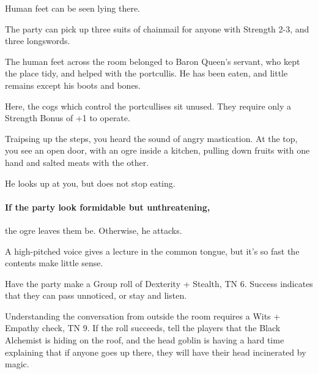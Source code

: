 \begin{multicols}{2}
\begin{boxtext}
	Human feet can be seen lying there.

\end{boxtext}

The party can pick up three suits of chainmail for anyone with Strength 2-3, and three longswords.

The human feet across the room belonged to Baron Queen's servant, who kept the place tidy, and helped with the portcullis.
He has been eaten, and little remains except his boots and bones.


Here, the cogs which control the portcullises sit unused.
They require only a Strength Bonus of +1 to operate.


\begin{boxtext}

	Traipsing up the steps, you heard the sound of angry mastication.
	At the top, you see an open door, with an ogre inside a kitchen, pulling down fruits with one hand and salted meats with the other.

	He looks up at you, but does not stop eating.

\end{boxtext}

\paragraph{If the party look formidable but unthreatening,}
the ogre leaves them be.
Otherwise, he attacks.



\begin{boxtext}

	A high-pitched voice gives a lecture in the common tongue, but it's so fast the contents make little sense.

\end{boxtext}

Have the party make a Group roll of Dexterity + Stealth, TN 6.
Success indicates that they can pass unnoticed, or stay and listen.

Understanding the conversation from outside the room requires a Wits + Empathy check, TN 9.
If the roll succeeds, tell the players that the Black Alchemist is hiding on the roof, and the head goblin is having a hard time explaining that if anyone goes up there, they will have their head incinerated by magic.



\end{multicols}
